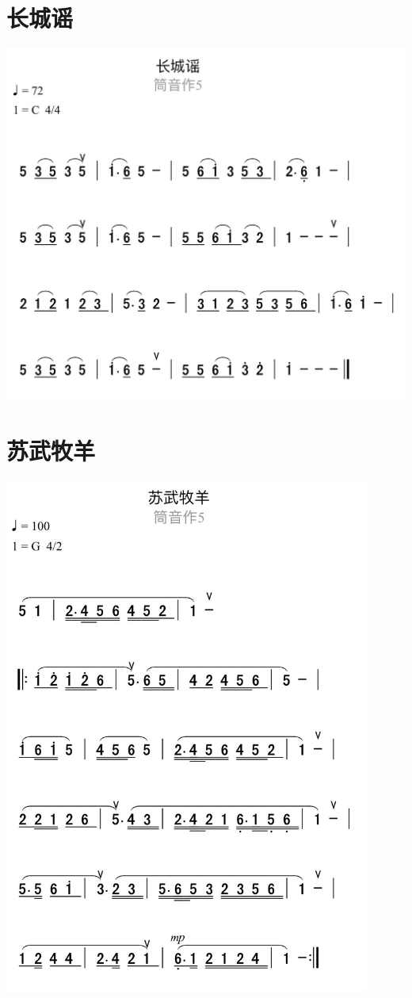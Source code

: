 \documentclass[cn,pad,chinese,chinesefont=nofont]{elegantbook}
\begin{document}
\section{长城谣}
	\includegraphics[width=\textwidth]{dongxiao/IMG_0857-长城谣.png} 
\section{苏武牧羊}
	\includegraphics[width=0.9\textwidth]{dongxiao/IMG_0862-苏武牧羊.png}
\end{document}
